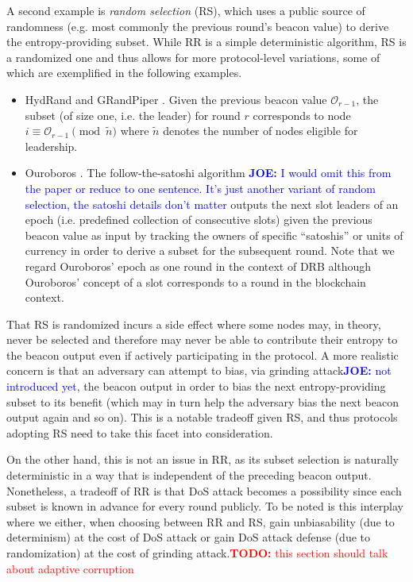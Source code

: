 \documentclass[letterpaper,twocolumn,10pt]{article}
\theoremstyle{definition}
\theoremstyle{remark}
\newcommand{\todo}[1]{\textcolor{red}{\textbf{TODO:} #1}}
\newcommand{\joenote}[1]{\textcolor{blue}{\textbf{JOE:} #1}}
\begin{document}
A second example is \textit{random selection} (RS), which uses a public source of randomness (e.g. most commonly the previous round's beacon value) to derive the entropy-providing subset. While RR is a simple deterministic algorithm, RS is a randomized one and thus allows for more protocol-level variations, some of which are exemplified in the following examples.
\begin{itemize}
\item HydRand \cite{schindler2020hydrand} and GRandPiper \cite{bhat2020randpiper}. Given the previous beacon value $\mathcal{O}_{r - 1}$, the subset (of size one, i.e. the leader) for round $r$ corresponds to node $i \equiv \mathcal{O}_{r - 1} \pmod{\tilde{n}}$ where $\tilde{n}$ denotes the number of nodes eligible for leadership.
\item Ouroboros \cite{kiayias2017ouroboros}. The follow-the-satoshi algorithm \cite{bentov2014proof,kiayias2017ouroboros}\joenote{I would omit this from the paper or reduce to one sentence. It's just another variant of random selection, the satoshi details don't matter} outputs the next slot leaders of an epoch (i.e. predefined collection of consecutive slots) given the previous beacon value as input by tracking the owners of specific ``satoshis'' or units of currency in order to derive a subset for the subsequent round. Note that we regard Ouroboros' epoch as one round in the context of DRB although Ouroboros' concept of a slot corresponds to a round in the blockchain context.
\end{itemize}

That RS is randomized incurs a side effect where some nodes may, in theory, never be selected and therefore may never be able to contribute their entropy to the beacon output even if actively participating in the protocol. A more realistic concern is that an adversary can attempt to bias, via grinding attack\joenote{not introduced yet}, the beacon output in order to bias the next entropy-providing subset to its benefit (which may in turn help the adversary bias the next beacon output again and so on). This is a notable tradeoff given RS, and thus protocols adopting RS need to take this facet into consideration.

On the other hand, this is not an issue in RR, as its subset selection is naturally deterministic in a way that is independent of the preceding beacon output. Nonetheless, a tradeoff of RR is that DoS attack becomes a possibility since each subset is known in advance for every round publicly. To be noted is this interplay where we either, when choosing between RR and RS, gain unbiasability (due to determinism) at the cost of DoS attack or gain DoS attack defense (due to randomization) at the cost of grinding attack.\todo{this section should talk about adaptive corruption}
\end{document}
